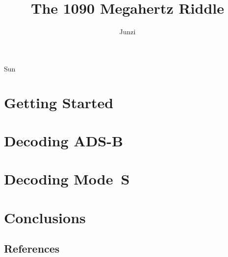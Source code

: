 \documentclass[openany]{r1090}                %
\date{}
\newcommand\1{\texttt{1}}
\newcommand\0{\texttt{0}}
\begin{document}
\title[A Guide to Decoding Mode S and ADS-B Signals]{The 1090 Megahertz Riddle}
\author{Junzi}{Sun}





\dedication{
  This book is dedicated to my sons: William and Vincent
}

\setcounter{tocdepth}{1}
\tableofcontents



\part{Getting Started}



\part{Decoding ADS-B}









\part{Decoding Mode~S}










\part{Conclusions}



\chapter*{References}
\printbibliography[heading=none]




\end{document}
